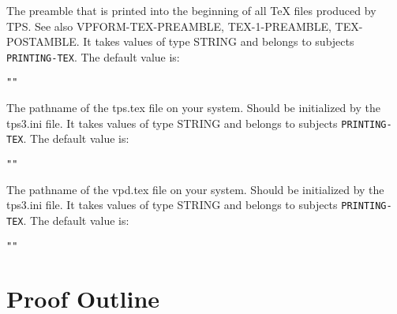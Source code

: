 \begin{description}
\item[TEX-PREAMBLE]  
The preamble that is printed into the beginning of all TeX 
files produced by TPS. See also VPFORM-TEX-PREAMBLE, TEX-1-PREAMBLE, 
TEX-POSTAMBLE.
It takes values of type STRING and belongs to subjects \texttt{PRINTING-TEX}.  The default value is: \begin{lstlisting}
""
\end{lstlisting}

\item[TPSTEX]  
The pathname of the tps.tex file on your system. Should 
be initialized by the tps3.ini file.
It takes values of type STRING and belongs to subjects \texttt{PRINTING-TEX}.  The default value is: \begin{lstlisting}
""
\end{lstlisting}

\item[VPDTEX]  
The pathname of the vpd.tex file on your system. Should 
be initialized by the tps3.ini file.
It takes values of type STRING and belongs to subjects \texttt{PRINTING-TEX}.  The default value is: \begin{lstlisting}
""
\end{lstlisting}

\item
\end{description}

\section{Proof Outline}

